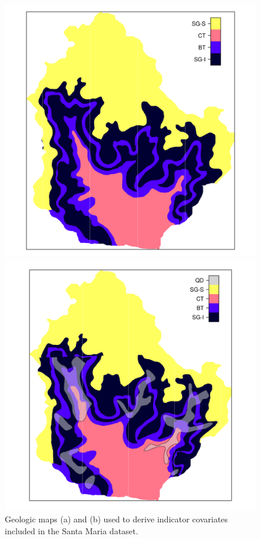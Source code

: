 \begin{figure}[!ht]
\centering
\begin{minipage}[b]{0.45\textwidth}
\subcaption{}
\centering
\includegraphics[width = \textwidth]{fig/chap05-geo-old}
\end{minipage}
\begin{minipage}[b]{0.45\textwidth}
\subcaption{}
\centering
\includegraphics[width = \textwidth]{fig/chap05-geo-new}
\end{minipage} 
\caption[Geologic maps included in the Santa Maria dataset.]{Geologic maps (a) \geoOld{} and (b) \geoNew{} used 
to derive indicator covariates included in the Santa Maria dataset.}
\label{fig:chap05-geo-maps}
\end{figure}

